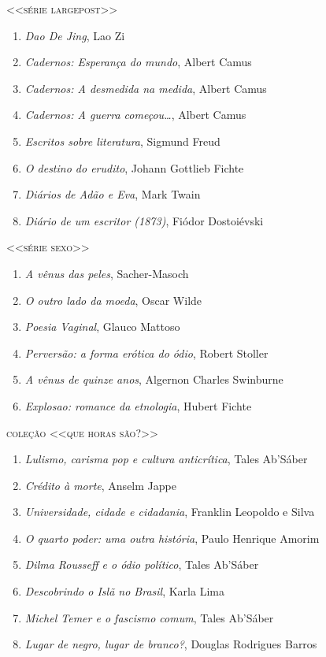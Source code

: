 {\large\textsc{<<série largepost>>}}

\begin{enumerate}
\setlength\parskip{4.2pt}
\setlength\itemsep{-1.4mm}
\item \textit{Dao De Jing}, Lao Zi
\item \textit{Cadernos: Esperança do mundo}, Albert Camus
\item \textit{Cadernos: A desmedida na medida}, Albert Camus
\item \textit{Cadernos: A guerra começou\ldots}, Albert Camus
\item \textit{Escritos sobre literatura}, Sigmund Freud
\item \textit{O destino do erudito}, Johann Gottlieb Fichte
\item \textit{Diários de Adão e Eva}, Mark Twain
\item \textit{Diário de um escritor (1873)}, Fiódor Dostoiévski
\end{enumerate}


\medskip

{\large\textsc{<<série sexo>>}}

\begin{enumerate}
\setlength\parskip{4.2pt}
\setlength\itemsep{-1.4mm}

\item \textit{A vênus das peles}, Sacher{}-Masoch
\item \textit{O outro lado da moeda}, Oscar Wilde
\item \textit{Poesia Vaginal}, Glauco Mattoso 
\item \textit{Perversão: a forma erótica do ódio}, Robert Stoller
\item \textit{A vênus de quinze anos}, Algernon Charles Swinburne
\item \textit{Explosao: romance da etnologia}, Hubert Fichte
\end{enumerate}

\medskip
{\large\textsc{coleção <<que horas são?>>}}

\begin{enumerate}
\setlength\parskip{4.2pt}
\setlength\itemsep{-1.4mm}
\item \textit{Lulismo, carisma pop e cultura anticrítica}, Tales Ab'Sáber
\item \textit{Crédito à morte}, Anselm Jappe
\item \textit{Universidade, cidade e cidadania}, Franklin Leopoldo e Silva
\item \textit{O quarto poder: uma outra história}, Paulo Henrique Amorim
\item \textit{Dilma Rousseff e o ódio político}, Tales Ab'Sáber
\item \textit{Descobrindo o Islã no Brasil}, Karla Lima
\item \textit{Michel Temer e o fascismo comum}, Tales Ab'Sáber
\item \textit{Lugar de negro, lugar de branco?}, Douglas Rodrigues Barros
\end{enumerate}

